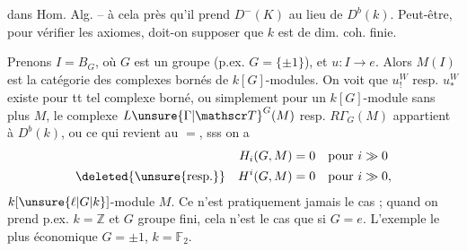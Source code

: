 dans Hom. Alg. -- à cela près qu'il  prend
$D^-(K)$ au lieu de $D^b(k)$. Peut-être,
pour vérifier les axiomes, doit-on supposer
que $k$ est de dim. coh. finie.

Prenons $I=B_G$, où $G$ est un
groupe (p.ex. $G=\{\pm1\}$),  et
$u:I\to e$. Alors $M(I)$ est la
catégorie des complexes bornés de
$k[G]$-modules. On voit que
$u^W_!$ resp. $u^W_*$ existe  pour tt
tel complexe borné, ou simplement pour
un $k[G]$-module sans plus $M$,
le complexe $L\unsure{\Gamma|\mathscr T}^{G}(M)$ resp. $R\Gamma_G(M)$
 appartient à $D^b(k)$, ou ce
qui revient au $=$, sss on a
\[
 \begin{aligned}
 H_i(G,M)&=0 &&\text{pour }i\gg0\\
 \text{\deleted{\unsure{resp.}}}\quad H^i(G,M)&=0 &&\text{pour }i\gg0,
 \end{aligned}
\]
 $k[\unsure{\ell|G|k}]$-module $M$. Ce n'est
pratiquement jamais le cas ;  quand
on prend p.ex. $k=\mathbb Z$ et $G$ groupe fini,
cela n'est le cas que si $G=e$. L'exemple
le plus économique   $G=\pm1$, $k=\mathbb F_2$.

